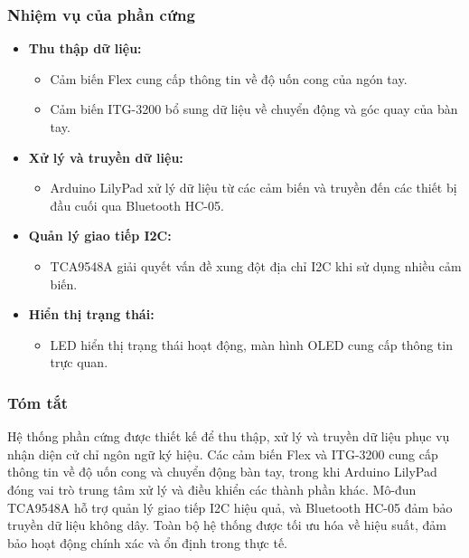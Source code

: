 \subsubsection{Nhiệm vụ của phần cứng}

\begin{itemize}
    \item \textbf{Thu thập dữ liệu:}
    \begin{itemize}
        \item Cảm biến Flex cung cấp thông tin về độ uốn cong của ngón tay.
        \item Cảm biến ITG-3200 bổ sung dữ liệu về chuyển động và góc quay của bàn tay.
    \end{itemize}

    \item \textbf{Xử lý và truyền dữ liệu:}
    \begin{itemize}
        \item Arduino LilyPad xử lý dữ liệu từ các cảm biến và truyền đến các thiết bị đầu cuối qua Bluetooth HC-05.
    \end{itemize}

    \item \textbf{Quản lý giao tiếp I2C:}
    \begin{itemize}
        \item TCA9548A giải quyết vấn đề xung đột địa chỉ I2C khi sử dụng nhiều cảm biến.
    \end{itemize}

    \item \textbf{Hiển thị trạng thái:}
    \begin{itemize}
        \item LED hiển thị trạng thái hoạt động, màn hình OLED cung cấp thông tin trực quan.
    \end{itemize}
\end{itemize}

\subsubsection{Tóm tắt}

Hệ thống phần cứng được thiết kế để thu thập, xử lý và truyền dữ liệu phục vụ nhận diện cử chỉ ngôn ngữ ký hiệu. Các cảm biến Flex và ITG-3200 cung cấp thông tin về độ uốn cong và chuyển động bàn tay, trong khi Arduino LilyPad đóng vai trò trung tâm xử lý và điều khiển các thành phần khác. Mô-đun TCA9548A hỗ trợ quản lý giao tiếp I2C hiệu quả, và Bluetooth HC-05 đảm bảo truyền dữ liệu không dây. Toàn bộ hệ thống được tối ưu hóa về hiệu suất, đảm bảo hoạt động chính xác và ổn định trong thực tế.


